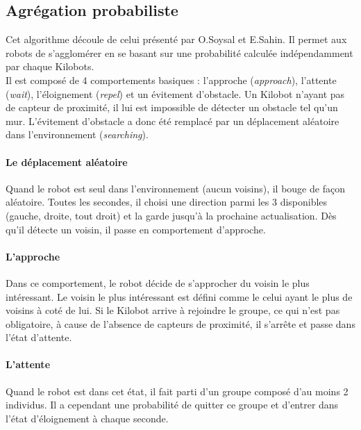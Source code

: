 \documentclass[a4paper]{article}
\begin{document}
\subsection{Agrégation probabiliste}

Cet algorithme découle de celui présenté par O.Soysal et E.Sahin. \cite{soysal_probabilistic_2005} Il permet aux robots de s'agglomérer en se basant sur une probabilité calculée indépendamment par chaque Kilobots.\\

Il est composé de 4 comportements basiques : l'approche
(\textit{approach}), l'attente
(\textit{wait}), l'éloignement 
(\textit{repel}) et un évitement d'obstacle.
Un Kilobot n'ayant pas de capteur de proximité, il lui est impossible de détecter un obstacle tel qu'un mur. L'évitement d'obstacle a donc été remplacé par un déplacement aléatoire dans l'environnement (\textit{searching}).
\paragraph{Le déplacement aléatoire} Quand le robot est seul dans l'environnement (aucun voisins), il bouge de façon aléatoire. Toutes les secondes, il choisi une direction parmi les 3 disponibles (gauche, droite, tout droit) et la garde jusqu'à la prochaine actualisation. Dès qu'il détecte un voisin, il passe en comportement d'approche.
\paragraph{L'approche}Dans ce comportement, le robot décide de s'approcher du voisin le plus intéressant. Le voisin le plus intéressant est défini comme le celui ayant le plus de voisins à coté de lui. Si le Kilobot arrive à rejoindre le groupe, ce qui n'est pas obligatoire, à cause de l'absence de capteurs de proximité, il s'arrête et passe dans l'état d'attente.
\paragraph{L'attente} Quand le robot est dans cet état, il fait parti d'un groupe composé d'au moins 2 individus. Il a cependant une probabilité de quitter ce groupe et d'entrer dans l'état d'éloignement à chaque seconde.
\end{document}
